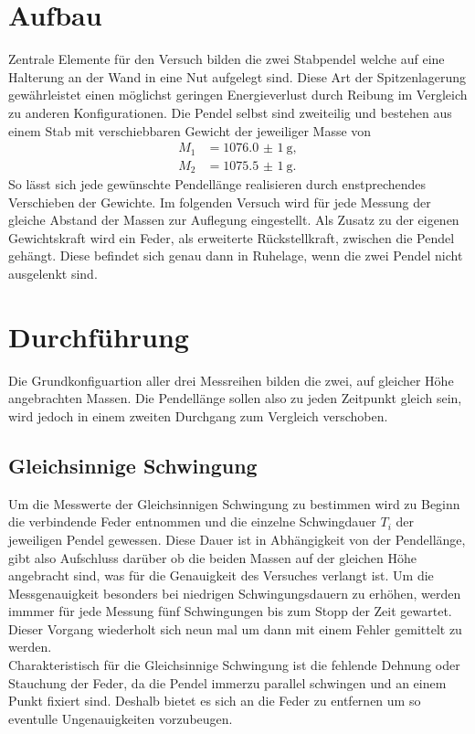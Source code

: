 \newpage
\section{Aufbau}
Zentrale Elemente für den Versuch bilden die zwei Stabpendel welche auf eine Halterung an der Wand in eine Nut aufgelegt sind.
Diese Art der Spitzenlagerung gewährleistet einen möglichst geringen Energieverlust durch Reibung im Vergleich zu anderen Konfigurationen. 
Die Pendel selbst sind zweiteilig und bestehen aus einem Stab mit verschiebbaren Gewicht der jeweiliger Masse von 
\begin{align*}
    M_1 &= \SI{1076,0(1)}{\g}, \\
    M_2 &= \SI{1075,5(1)}{\g}.
\end{align*}
So lässt sich jede gewünschte Pendellänge realisieren durch enstprechendes Verschieben der Gewichte. Im folgenden Versuch wird 
für jede Messung der gleiche Abstand der Massen zur Auflegung eingestellt.
Als Zusatz zu der eigenen Gewichtskraft wird ein Feder, als erweiterte Rückstellkraft, zwischen die Pendel gehängt. 
Diese befindet sich genau dann in Ruhelage, wenn die zwei Pendel nicht ausgelenkt sind. 

\section{Durchführung}
Die Grundkonfiguartion aller drei Messreihen bilden die zwei, auf gleicher Höhe angebrachten Massen. Die Pendellänge sollen also zu jeden Zeitpunkt
gleich sein, wird jedoch in einem zweiten Durchgang zum Vergleich verschoben.

\subsection{Gleichsinnige Schwingung}
Um die Messwerte der Gleichsinnigen Schwingung zu bestimmen wird zu Beginn die verbindende Feder entnommen und 
die einzelne Schwingdauer $T_i$ der jeweiligen Pendel gewessen. Diese Dauer ist in Abhängigkeit von der Pendellänge, gibt also 
Aufschluss darüber ob die beiden Massen auf der gleichen Höhe angebracht sind, was für die Genauigkeit des Versuches verlangt ist.
Um die Messgenauigkeit besonders bei niedrigen Schwingungsdauern zu erhöhen, werden immmer für jede Messung fünf Schwingungen 
bis zum Stopp der Zeit gewartet. Dieser Vorgang wiederholt sich neun mal um dann mit einem Fehler gemittelt zu werden. 
\\
\newline
Charakteristisch für die Gleichsinnige Schwingung ist die fehlende Dehnung oder Stauchung der Feder, da die Pendel immerzu 
parallel schwingen und an einem Punkt fixiert sind. Deshalb bietet es sich an die Feder zu entfernen um so eventulle Ungenauigkeiten 
vorzubeugen.

